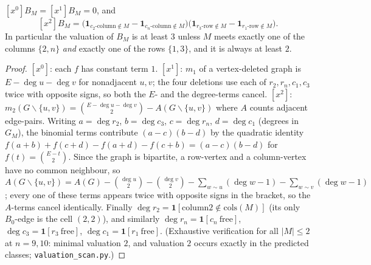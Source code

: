 \begin{lemma}[valuation]\label{lem:valuation}
$[x^0]B_M=[x^1]B_M=0$, and
\[
[x^2]B_M=\bigl(\mathbf 1_{c_2\text{-column}\notin M}-\mathbf 1_{c_n\text{-column}\notin M}\bigr)
\bigl(\mathbf 1_{r_3\text{-row}\notin M}-\mathbf 1_{r_1\text{-row}\notin M}\bigr).
\]
In particular the valuation of $B_M$ is at least $3$ unless $M$ meets
exactly one of the columns $\{2,n\}$ \emph{and} exactly one of the rows
$\{1,3\}$, and it is always at least $2$.
\end{lemma}

\begin{proof}
$[x^0]$: each $f$ has constant term $1$.  $[x^1]$: $m_1$ of a vertex-deleted
graph is $E-\deg u-\deg v$ for nonadjacent $u,v$; the four deletions use
each of $r_2,r_n,c_1,c_3$ twice with opposite signs, so both the $E$- and
the degree-terms cancel.  $[x^2]$: $m_2(G\smallsetminus\{u,v\})=
\binom{E-\deg u-\deg v}{2}-A(G\smallsetminus\{u,v\})$ where $A$ counts
adjacent edge-pairs.  Writing $a=\deg r_2$, $b=\deg c_3$, $c=\deg r_n$,
$d=\deg c_1$ (degrees in $G_M$), the binomial terms contribute
$(a-c)(b-d)$ by the quadratic identity
$f(a{+}b)+f(c{+}d)-f(a{+}d)-f(c{+}b)=(a-c)(b-d)$ for
$f(t)=\binom{E-t}{2}$.  Since the graph is bipartite, a row-vertex and a
column-vertex have no common neighbour, so
$A(G\smallsetminus\{u,v\})=A(G)-\binom{\deg u}{2}-\binom{\deg v}{2}
-\sum_{w\sim u}(\deg w-1)-\sum_{w\sim v}(\deg w-1)$; every one of these
terms appears twice with opposite signs in the bracket, so the $A$-terms
cancel identically.  Finally $\deg r_2=\mathbf 1[\text{column
}2\notin\mathrm{cols}(M)]$ (its only $B_0$-edge is the cell $(2,2)$),
and similarly $\deg r_n=\mathbf 1[c_n\ \mathrm{free}]$,
$\deg c_3=\mathbf 1[r_3\ \mathrm{free}]$, $\deg c_1=\mathbf 1[r_1\ \mathrm{free}]$.
(Exhaustive verification for all $|M|\le2$ at $n=9,10$:
minimal valuation $2$, and valuation $2$ occurs exactly in the predicted
classes; \texttt{valuation\_scan.py}.)
\end{proof}


